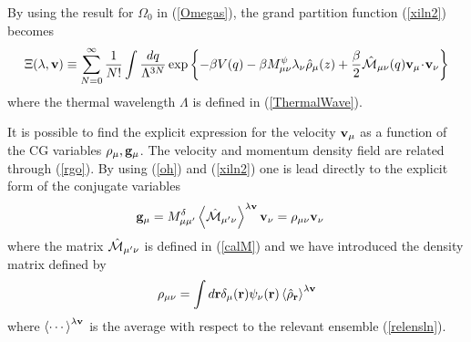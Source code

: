 \documentclass[b5paper,openright,11pt]{book}
\newcommand{\esc}{\!\cdot\!}
\newcommand{\llangle}{\left\langle}
\newcommand{\rrangle}{\right\rangle}
\begin{document}
\begin{appendices}
By using the result for $\Omega_0$ in (\ref{Omegas}),  the  grand  partition  function
(\ref{xiln2}) becomes
\begin{align}
\Xi(\lambda,{\bf v})\equiv \sum_{N=0}^\infty \frac{1}{N!}
\int \frac{dq}{\Lambda^{3N}}
\exp\left\{-\beta V(q)-\beta M^\psi_{\mu\nu}\lambda_\nu\hat{\rho}_{\mu}(z)+\frac{\beta}{2}\hat{\cal M}_{\mu\nu}(q){\bf v}_\mu \esc{\bf v}_\nu
\right\}
\label{xiln2b}
\end{align}
where the thermal wavelength $\Lambda$ is  defined in (\ref{ThermalWave}).



It is possible to find the  explicit expression for the velocity ${\bf
  v}_\mu$ as  a function of  the CG variables  $\rho_\mu,{\bf g}_\mu$.
The  velocity   and  momentum   density  field  are   related  through
(\ref{rgo}).   By  using  (\ref{oh})  and (\ref{xiln2})  one  is  lead
directly to the explicit form of the conjugate variables
\begin{align}
{\bf g}_\mu&=M^\delta_{\mu\mu'}\llangle \hat{\cal M}_{\mu'\nu}\rrangle^{\lambda {\bf v}} {\bf v}_\nu =\rho_{\mu\nu}{\bf v}_\nu
\label{nu2}
\end{align}
where the  matrix $\hat{\cal M}_{\mu'\nu}$ is  defined in (\ref{calM})
and we have introduced the density matrix defined by
\begin{align}
  \rho_{\mu\nu} =\int d{\bf r}
\delta_\mu({\bf r})\psi_\nu({\bf r})\llangle\hat{\rho}_{\bf r}\rrangle^{\lambda{\bf v}}
\end{align}
where $\llangle\cdots\rrangle^{\lambda{\bf v}}$  is the average  with respect
to   the  relevant   ensemble   (\ref{relensln}). 


\end{appendices}
\end{document}
